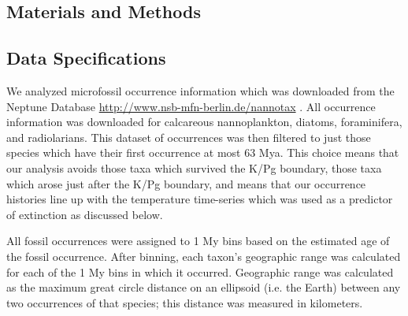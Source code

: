 \documentclass[12pt,letterpaper]{article}
\begin{document}
\begin{refsection}


\section{Materials and Methods}

\subsection{Data Specifications}

We analyzed microfossil occurrence information which was downloaded from the Neptune Database \url{http://www.nsb-mfn-berlin.de/nannotax} \citep{Lazarus1994,SpencerCervato1999}. All occurrence information was downloaded for calcareous nannoplankton, diatoms, foraminifera, and radiolarians.%
This dataset of occurrences was then filtered to just those species which have their first occurrence at most 63 Mya. This choice means that our analysis avoids those taxa which survived the K/Pg boundary, those taxa which arose just after the K/Pg boundary, and means that our occurrence histories line up with the temperature time-series which was used as a predictor of extinction as discussed below.

All fossil occurrences were assigned to 1 My bins based on the estimated age of the fossil occurrence. After binning, each taxon's geographic range was calculated for each of the 1 My bins in which it occurred. Geographic range was calculated as the maximum great circle distance on an ellipsoid (i.e. the Earth) between any two occurrences of that species; this distance was measured in kilometers. 


\end{refsection}
\end{document}
